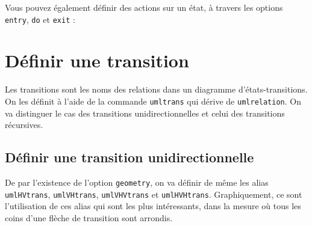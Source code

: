 \documentclass[a4paper,11pt]{report}
\newcommand{\inputTikZ}[1]{%
  }%
\newcommand{\inputTikZ}[1]{%
    \texttt{[image: fig/\#1.pdf]}%
  }%
\begin{document}
\medskip

\begin{minipage}{0.51\textwidth}

\end{minipage}
\begin{minipage}{0.49\textwidth}
\begin{center}
\inputTikZ{statename}
\end{center}
\end{minipage}

\medskip

Vous pouvez également définir des actions sur un état, à travers les options {\tt entry}, {\tt do} et {\tt exit} :

\medskip

\begin{minipage}{0.51\textwidth}

\end{minipage}
\begin{minipage}{0.49\textwidth}
\begin{center}
\inputTikZ{stateactions}
\end{center}
\end{minipage}

\section{Définir une transition}\label{s.trans}

Les transitions sont les noms des relations dans un diagramme d'états-transitions. On les définit à l'aide de la commande {\tt umltrans} qui dérive de {\tt umlrelation}. On va distinguer le cas des transitions unidirectionnelles et celui des transitions récursives.

\subsection{Définir une transition unidirectionnelle}\label{s.unitrans}

De par l'existence de l'option {\tt geometry}, on va définir de même les alias {\tt umlHVtrans}, {\tt umlVHtrans}, {\tt umlVHVtrans} et {\tt umlHVHtrans}. Graphiquement, ce sont l'utilisation de ces alias qui sont les plus intéressants, dans la mesure où tous les coins d'une flèche de transition sont arrondis.

\medskip

\begin{minipage}{0.51\textwidth}

\end{minipage}
\begin{minipage}{0.49\textwidth}
\begin{center}
\inputTikZ{transition}
\end{center}
\end{minipage}
\end{document}

